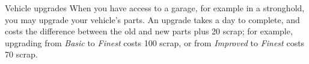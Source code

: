 \begin{abstractsection}{Vehicle upgrades}
  When you have access to a garage, for example in a stronghold, you may upgrade your vehicle's parts. An upgrade takes a day to complete, and costs the difference between the old and new parts plus 20 scrap; for example, upgrading from \emph{Basic} to \emph{Finest} costs 100 scrap, or from \emph{Improved} to \emph{Finest} costs 70 scrap.
\end{abstractsection}
